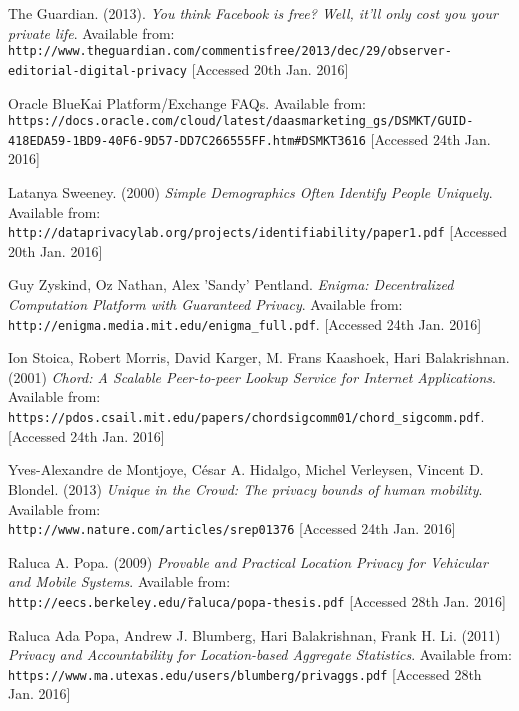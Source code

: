 \renewcommand\bibname{References}
\begin{thebibliography}{9}
The Guardian. (2013). \textit{You think Facebook is free? Well, it'll only cost you your private life}. Available from: \\\texttt{http://www.theguardian.com/commentisfree/2013/dec/29/observer-editorial-digital\--privacy} [Accessed 20th Jan. 2016]

Oracle BlueKai Platform/Exchange FAQs. Available from:
\\\texttt{https://docs.oracle.com/cloud/latest/daasmarketing\_gs/DSMKT/GUID-418EDA59\--1BD9-40F6-9D57-DD7C266555FF.htm\#DSMKT3616} [Accessed 24th Jan. 2016]

Latanya Sweeney. (2000) \textit{Simple Demographics Often Identify People Uniquely}. Available from: \texttt{http://dataprivacylab.org/projects/identifiability/paper1.pdf} [Accessed 20th Jan. 2016]

Guy Zyskind, Oz Nathan, Alex 'Sandy' Pentland. \textit{Enigma: Decentralized Computation Platform with Guaranteed Privacy}. Available from:
\\\texttt{http://enigma.media.mit.edu/enigma\_full.pdf}. [Accessed 24th Jan. 2016]

Ion Stoica, Robert Morris, David Karger, M. Frans Kaashoek, Hari Balakrishnan. (2001) \textit{Chord: A Scalable Peer-to-peer Lookup Service for Internet Applications}. Available from:
\\\texttt{https://pdos.csail.mit.edu/papers/chord\:sigcomm01/chord\_sigcomm.pdf}. [Accessed 24th Jan. 2016]

Yves-Alexandre de Montjoye, César A. Hidalgo, Michel Verleysen, Vincent D. Blondel. (2013) \textit{Unique in the Crowd: The privacy bounds of human mobility}. Available from: \\
\texttt{http://www.nature.com/articles/srep01376} [Accessed 24th Jan. 2016]

Raluca A. Popa. (2009) \textit{Provable and Practical Location Privacy for Vehicular and Mobile Systems}. Available from:
\\\texttt{http://eecs.berkeley.edu/\~raluca/popa-thesis.pdf} [Accessed 28th Jan. 2016]

Raluca Ada Popa, Andrew J. Blumberg, Hari Balakrishnan, Frank H. Li. (2011) \textit{Privacy and Accountability for Location-based Aggregate Statistics}. Available from:
\\\texttt{https://www.ma.utexas.edu/users/blumberg/privaggs.pdf}
[Accessed 28th Jan. 2016]


\end{thebibliography}

